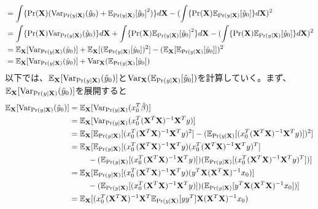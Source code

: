 \documentclass{jsarticle}
\begin{document}
\begin{enumerate}
\begin{align*}
&=\int \{ \Pr({\bf X})({\rm Var}_{\Pr(y|{\bf X})}(\hat{y}_0) +{\mathbb{E}_{\Pr(y|{\bf X})}[\hat{y}_0]}^2)\}d{\bf X}
-(\int \{\Pr({\bf X})\mathbb{E}_{\Pr(y|{\bf X})}[\hat{y}_0]\}d{\bf X})^2\\
&=\int \{\Pr({\bf X}) {\rm Var}_{\Pr(y|{\bf X})}(\hat{y}_0)\}d{\bf X} +
 \int\{\Pr({\bf X}){\mathbb{E}_{\Pr(y|{\bf X})}[\hat{y}_0]}^2\}d{\bf X}
-(\int \{\Pr({\bf X})\mathbb{E}_{\Pr(y|{\bf X})}[\hat{y}_0]\}d{\bf X})^2\\
&=\mathbb{E}_{{\bf X}}[{\rm Var}_{\Pr(y|{\bf X})}(\hat{y}_0)]
+\mathbb{E}_{{\bf X}}[(\mathbb{E}_{\Pr(y|{\bf X})}[\hat{y}_0])^2]
-(\mathbb{E}_{{\bf X}}[\mathbb{E}_{\Pr(y|{\bf X})}[\hat{y}_0]])^2\\
&=\mathbb{E}_{{\bf X}}[{\rm Var}_{\Pr(y|{\bf X})}(\hat{y}_0)]
+{\rm Var}_{{\bf X}}(\mathbb{E}_{\Pr(y|{\bf X})}[\hat{y}_0])
\end{align*}
以下では、$\mathbb{E}_{{\bf X}}[{\rm Var}_{\Pr(y|{\bf X})}(\hat{y}_0)]$と${\rm Var}_{{\bf X}}(\mathbb{E}_{\Pr(y|{\bf X})}[\hat{y}_0])$を計算していく。まず、$\mathbb{E}_{{\bf X}}[{\rm Var}_{\Pr(y|{\bf X})}(\hat{y}_0)]$を展開すると
\begin{align*}
\mathbb{E}_{{\bf X}}[{\rm Var}_{\Pr(y|{\bf X})}(\hat{y}_0)]&=\mathbb{E}_{{\bf X}}[{\rm Var}_{\Pr(y|{\bf X})}(x_0^T\hat{\beta})]\\
&=\mathbb{E}_{{\bf X}}[{\rm Var}_{\Pr(y|{\bf X})}(x_0^T ({\bf X}^T{\bf X})^{-1}{\bf X}^Ty)]\\
&=\mathbb{E}_{{\bf X}}[\mathbb{E}_{\Pr(y|{\bf X})}[(x_0^T ({\bf X}^T{\bf X})^{-1}{\bf X}^Ty)^2]-(\mathbb{E}_{\Pr(y|{\bf X})}[(x_0^T ({\bf X}^T{\bf X})^{-1}{\bf X}^Ty)])^2]\\
&=\mathbb{E}_{{\bf X}}[\mathbb{E}_{\Pr(y|{\bf X})}[(x_0^T ({\bf X}^T{\bf X})^{-1}{\bf X}^Ty)(x_0^T ({\bf X}^T{\bf X})^{-1}{\bf X}^Ty)^T]\\
&\ \ \ \ \ \ \ -(\mathbb{E}_{\Pr(y|{\bf X})}[(x_0^T ({\bf X}^T{\bf X})^{-1}{\bf X}^Ty)])(\mathbb{E}_{\Pr(y|{\bf X})}[(x_0^T ({\bf X}^T{\bf X})^{-1}{\bf X}^Ty)^T])]\\
&=\mathbb{E}_{{\bf X}}[\mathbb{E}_{\Pr(y|{\bf X})}[(x_0^T ({\bf X}^T{\bf X})^{-1}{\bf X}^Ty)(y^T{\bf X}({\bf X}^T{\bf X})^{-1}x_0)]\\
&\ \ \ \ \ \ \ -(\mathbb{E}_{\Pr(y|{\bf X})}[(x_0^T ({\bf X}^T{\bf X})^{-1}{\bf X}^Ty)])(\mathbb{E}_{\Pr(y|{\bf X})}[y^T{\bf X}({\bf X}^T{\bf X})^{-1}x_0])]\\
&=\mathbb{E}_{{\bf X}}[(x_0^T ({\bf X}^T{\bf X})^{-1}{\bf X}^T\mathbb{E}_{\Pr(y|{\bf X})}[yy^T]{\bf X}({\bf X}^T{\bf X})^{-1}x_0)\\

\end{align*}
\end{enumerate}
\end{document}
